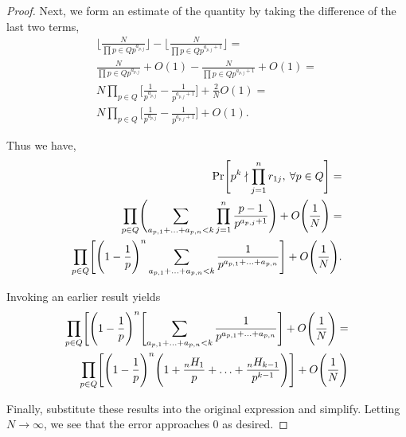 \documentclass[12pt]{amsart}
\theoremstyle{definition}
\begin{document}
\begin{proof}
	Next, we form an estimate of the quantity by taking the difference of the last two terms, 
	\begin{align*}
		\Biggl\lfloor \frac{N}{\prod {p\in Q} p^{a_{p,j}}} \Biggr\rfloor - \Biggl\lfloor \frac{N}{\prod {p\in Q} p^{a_{p,j}+1}} \Biggr\rfloor =\\
		\frac{N}{\prod {p\in Q} p^{a_{p,j}}} + O(1) -  \frac{N}{\prod {p\in Q} p^{a_{p,j}+1}} + O(1) =\\
		N\prod_ {p\in Q}\Biggl[ \frac{1}{ p^{a_{p,j}}}  -  \frac{1}{ p^{a_{p,j}+1}} \Biggr]+ \frac{2}{N}O(1)=\\
		N\prod_ {p\in Q}\Biggl[ \frac{1}{ p^{a_{p,j}}}  -  \frac{1}{ p^{a_{p,j}+1}} \Biggr]+ O(1).
	\end{align*}
	
	Thus we have,
	\begin{align*}
		\Pr\Biggl[p^k\nmid \prod_{j=1}^{n}r_{1j},\: \forall p\in Q\Biggr] =\\
		\prod_{p\in Q} \Biggl(\sum_{a_{p,1}+\mathellipsis+a_{p,n}<k}\prod_{j=1}^{n}\frac{p-1}{p^{a_{p,j}+1}}\Biggr)+O\Biggl(\frac{1}{N}\Biggr) = \\
		\prod_{p\in Q}\Biggl[\Biggl(1-\frac{1}{p}\Biggr)^n\sum_{a_{p,1}+\mathellipsis+a_{p,n}<k}\frac{1}{p^{a_{p,1}+\mathellipsis+a_{p,n}}}\Biggr]+O\Biggl(\frac{1}{N}\Biggr).
	\end{align*}
	
	Invoking an earlier result yields
	\begin{align*}
		\prod_{p\in Q}\Biggl[\Biggl(1-\frac{1}{p}\Biggr)^n\Biggl[\sum_{a_{p,1}+\mathellipsis+a_{p,n}<k}\frac{1}{p^{a_{p,1}+\mathellipsis+a_{p,n}}}\Biggr]+O\Biggl(\frac{1}{N}\Biggr)=\\
		\prod_{p\in Q}\Biggl[\Biggl(1-\frac{1}{p}\Biggr)^n\Biggl(1+\frac{_nH_1}{p}+\mathellipsis+\frac{_nH_{k-1}}{p^{k-1}}\Biggr)\Biggr]+O\Biggl(\frac{1}{N}\Biggr)
	\end{align*}
	
	Finally, substitute these results into the original expression and simplify. Letting $N\to \infty$, we see that the error approaches 0 as desired.
\end{proof}



\newpage
\end{document}

